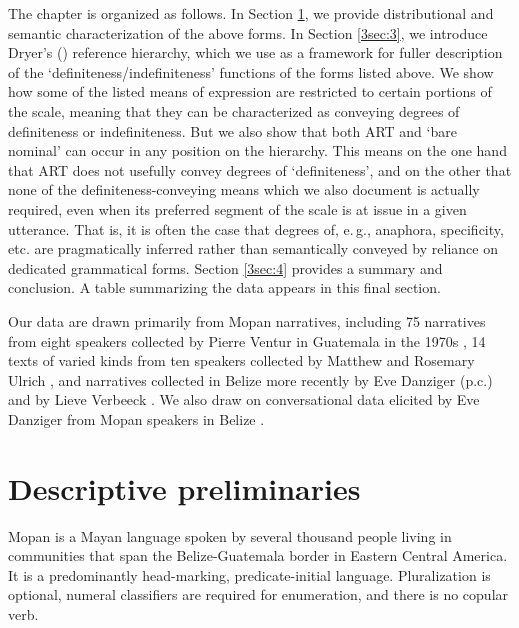 \documentclass[output=paper]{langsci/langscibook}
\begin{document}
The chapter is organized as follows.  In Section \ref{3sec:2}, we provide distributional and semantic characterization of the above forms.  In Section \ref{3sec:3}, we introduce Dryer's (\citeyear{dryer:14}) reference hierarchy, which we use as a framework for fuller description of the `definiteness/indefiniteness' functions of the forms listed above.  We show how some of the listed means of expression are restricted to certain portions of the scale, meaning that they can be characterized as conveying degrees of definiteness or indefiniteness. But we also show that both ART and `bare nominal' can occur in any position on the hierarchy. This means on the one hand that ART does not usefully convey degrees of `definiteness', and on the other that  none of the definiteness-conveying means which we also document is actually required, even when its preferred segment of the scale is at issue in a given utterance. That is, it is often the case that degrees of, e.\,g., anaphora, specificity, etc. are pragmatically inferred rather than semantically conveyed by reliance on dedicated grammatical forms. Section \ref{3sec:4} provides a summary and conclusion. A table summarizing the data appears in this final section.

Our data are drawn primarily from Mopan narratives, including 75 narratives from eight speakers collected by Pierre Ventur in Guatemala in the 1970s \citep{ventur:76}, 14 texts of varied kinds from ten speakers collected by Matthew and Rosemary Ulrich \citep{ulrich:ulrich:82}, and narratives collected in Belize more recently by Eve Danziger (p.c.) and by Lieve Verbeeck \citep{verbeeck:99}. We also draw on conversational data elicited by Eve Danziger from Mopan speakers in Belize \citep{danziger:94}.


\section{Descriptive preliminaries}\label{3sec:2}

{
Mopan is a Mayan language spoken by several thousand people living in communities that span the Belize-Guatemala border in Eastern Central America.  It is a predominantly head-marking, predicate-initial language. Pluralization is optional, numeral classifiers are required for enumeration, and there is no copular verb.
}
\end{document}
